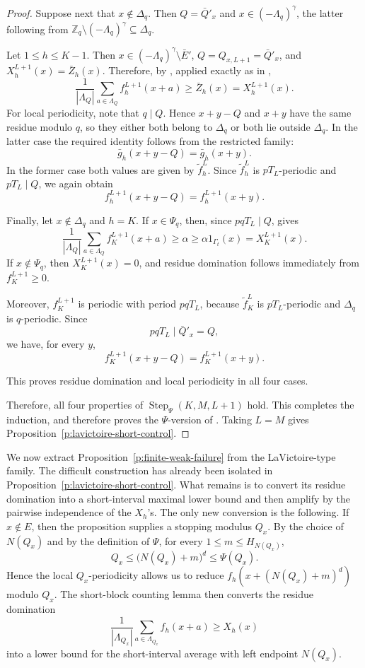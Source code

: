\documentclass[12pt,leqno]{amsart}
\numberwithin{equation}{section}
\numberwithin{counter2}{section}
\theoremstyle{definition}
\theoremstyle{plain}
\begin{document}
\begin{proof}
\medskip

Suppose next that \(x\notin\Delta_q\). Then $Q=\bar Q'_x$ and  $x\in(-\Lambda_q)^\gamma$,
the latter following from
\(\mathbb Z_q\setminus(-\Lambda_q)^\gamma\subseteq\Delta_q\).

Let \(1\leq h\leq K-1\). Then
\(x\in(-\Lambda_q)^\gamma\setminus\bar E'\),
\(Q=Q_{x,L+1}=\bar Q'_x\), and
\(X_h^{L+1}(x)=\bar Z_h(x)\). Therefore, by
\cite[Lemma~7.1]{L9}, applied exactly as in
\cite[Section~8, verification of property~(4)]{L9},
\[
\frac1{|\Lambda_Q|}
\sum_{a\in\Lambda_Q}f_h^{L+1}(x+a)
\geq
\bar Z_h(x)
=
X_h^{L+1}(x).
\]
For local periodicity, note that \(q\mid Q\). Hence \(x+y-Q\) and \(x+y\)
have the same residue modulo \(q\), so they either both belong to \(\Delta_q\)
or both lie outside \(\Delta_q\). In the latter case the required identity
follows from the restricted family:
\[
\bar g_h(x+y-Q)=\bar g_h(x+y).
\]
In the former case both values are given by \(\widetilde f_h^L\). Since
\(\widetilde f_h^L\) is \(pT_L\)-periodic and \(pT_L\mid Q\), we again obtain
\[
f_h^{L+1}(x+y-Q)=f_h^{L+1}(x+y).
\]

Finally, let \(x\notin\Delta_q\) and \(h=K\). If \(x\in\Psi_q\), then,
since \(pqT_L\mid Q\), \cite[Lemma~6.1]{L9} gives
\[
\frac1{|\Lambda_Q|}
\sum_{a\in\Lambda_Q}f_K^{L+1}(x+a)
\geq\alpha
\geq\alpha1_{\Gamma_t}(x)
=X_K^{L+1}(x).
\]
If \(x\notin\Psi_q\), then \(X_K^{L+1}(x)=0\), and residue domination
follows immediately from \(f_K^{L+1}\geq0\).

Moreover, \(f_K^{L+1}\) is periodic with period \(pqT_L\), because
\(\widetilde f_K^L\) is \(pT_L\)-periodic and \(\Delta_q\) is \(q\)-periodic.
Since
\[
pqT_L\mid\bar Q'_x=Q,
\]
we have, for every \(y\),
\[
f_K^{L+1}(x+y-Q)=f_K^{L+1}(x+y).
\]

This proves residue domination and local periodicity in all four cases.

	Therefore,  all four properties of
	\(\operatorname{Step}_{\Psi}(K,M,L+1)\) hold. This completes the induction, and
	therefore proves the \(\Psi\)-version of \cite[Proposition~4.1]{L9}. Taking
	\(L=M\) gives Proposition~\ref{p:lavictoire-short-control}.
\end{proof}



We now  extract
Proposition~\ref{p:finite-weak-failure} from the LaVictoire-type family. The
difficult construction has already been isolated in
Proposition~\ref{p:lavictoire-short-control}. What remains is to convert its
residue domination into a short-interval maximal lower bound and then amplify by
the pairwise independence of the \(X_h\)'s.
The only new conversion is the following. If \(x\notin E\), then the proposition
supplies a stopping modulus \(Q_x\). By the choice of \(N(Q_x)\) and by the
definition of \(\Psi\), for every \(1\leq m\leq H_{N(Q_x)}\),
\[
Q_x
\leq
\bigl(N(Q_x)+m\bigr)^d
\leq
\Psi(Q_x).
\]
Hence the local \(Q_x\)-periodicity allows us to reduce
\(f_h(x+(N(Q_x)+m)^d)\) modulo \(Q_x\). The short-block counting lemma then
converts the residue domination
\[
\frac1{|\Lambda_{Q_x}|}
\sum_{a\in\Lambda_{Q_x}}f_h(x+a)
\geq
X_h(x)
\]
into a lower bound for the short-interval average with left endpoint \(N(Q_x)\).
\end{document}
